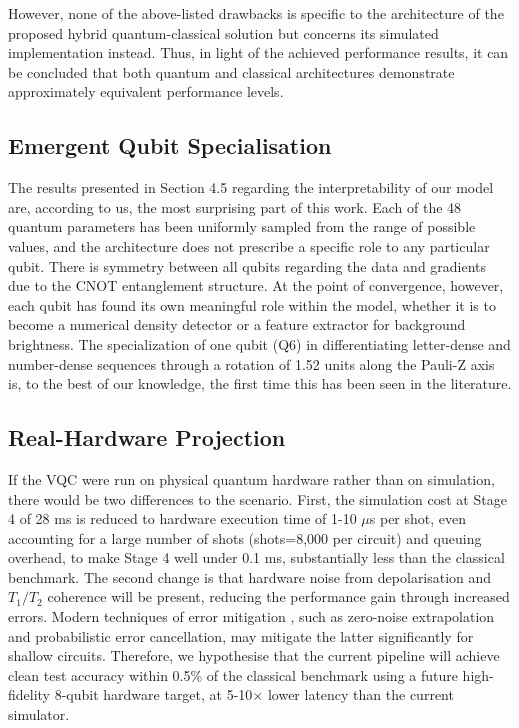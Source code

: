 \documentclass{ieeeaccess}
\begin{document}
However, none of the above-listed drawbacks is specific to the architecture of the proposed hybrid quantum-classical solution but concerns its simulated implementation instead. Thus, in light of the achieved performance results, it can be concluded that both quantum and classical architectures demonstrate approximately equivalent performance levels.

\subsection{Emergent Qubit Specialisation}
The results presented in Section 4.5 regarding the interpretability of our model are, according to us, the most surprising part of this work. Each of the 48 quantum parameters has been uniformly sampled from the range of possible values, and the architecture does not prescribe a specific role to any particular qubit. There is symmetry between all qubits regarding the data and gradients due to the CNOT entanglement structure. At the point of convergence, however, each qubit has found its own meaningful role within the model, whether it is to become a numerical density detector or a feature extractor for background brightness. The specialization of one qubit (Q6) in differentiating letter-dense and number-dense sequences through a rotation of 1.52 units along the Pauli-Z axis is, to the best of our knowledge, the first time this has been seen in the literature.

\subsection{Real-Hardware Projection}
If the VQC were run on physical quantum hardware rather than on simulation, there would be two differences to the scenario. First, the simulation cost at Stage 4 of 28 ms is reduced to hardware execution time of 1-10 $\mu$s per shot, even accounting for a large number of shots (shots=8,000 per circuit) and queuing overhead, to make Stage 4 well under 0.1 ms, substantially less than the classical benchmark. The second change is that hardware noise from depolarisation and $T_1/T_2$ coherence will be present, reducing the performance gain through increased errors. Modern techniques of error mitigation \cite{b10}, such as zero-noise extrapolation and probabilistic error cancellation, may mitigate the latter significantly for shallow circuits. Therefore, we hypothesise that the current pipeline will achieve clean test accuracy within 0.5\% of the classical benchmark using a future high-fidelity 8-qubit hardware target, at 5-10$\times$ lower latency than the current simulator.
\end{document}
